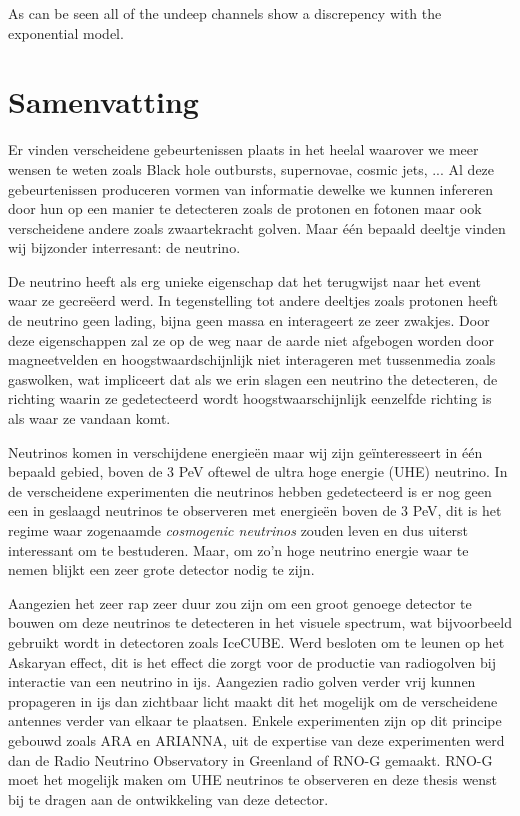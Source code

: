 \documentclass[11pt,a4paper,faculty=we,language=en,doctype=report]{cls/ugent-doc}
\begin{document}
As can be seen all of the undeep channels show a discrepency with
the exponential model. 

\newpage
\chapter*{Samenvatting}
Er vinden verscheidene gebeurtenissen plaats in het heelal waarover we
meer wensen te weten zoals Black hole outbursts, supernovae, cosmic jets, ...
Al deze gebeurtenissen produceren vormen van informatie dewelke we kunnen
infereren door hun op een manier te detecteren zoals de protonen en fotonen
maar ook verscheidene andere zoals zwaartekracht golven.
Maar één bepaald deeltje vinden wij bijzonder interresant: de neutrino.

De neutrino heeft als erg unieke eigenschap dat het terugwijst naar het event
waar ze gecreëerd werd. In tegenstelling tot andere deeltjes zoals protonen
heeft de neutrino geen lading, bijna geen massa en interageert ze zeer zwakjes.
Door deze eigenschappen zal ze op de weg naar de aarde niet afgebogen worden 
door magneetvelden en hoogstwaardschijnlijk niet interageren met tussenmedia zoals
gaswolken, wat impliceert dat als we erin slagen een neutrino the detecteren, de 
richting waarin ze gedetecteerd wordt hoogstwaarschijnlijk eenzelfde richting is als
waar ze vandaan komt.

Neutrinos komen in verschijdene energieën maar wij zijn geïnteresseert in één bepaald gebied,
boven de 3 PeV oftewel de ultra hoge energie (UHE) neutrino. In de verscheidene experimenten die 
neutrinos hebben gedetecteerd is er nog geen een in geslaagd neutrinos te observeren met 
energieën boven de 3 PeV, dit is het regime waar zogenaamde \textit{cosmogenic neutrinos} zouden
leven en dus uiterst interessant om te bestuderen. Maar, om zo'n hoge neutrino energie waar te nemen
blijkt een zeer grote detector nodig te zijn.

Aangezien het zeer rap zeer duur zou zijn om een groot genoege detector te bouwen om deze neutrinos 
te detecteren in het visuele spectrum, wat bijvoorbeeld gebruikt wordt in detectoren zoals IceCUBE.
Werd besloten om te leunen op het Askaryan effect, dit is het effect die zorgt voor de productie
van radiogolven bij interactie van een neutrino in ijs. Aangezien radio golven verder vrij kunnen
propageren in ijs dan zichtbaar licht maakt dit het mogelijk om de verscheidene antennes verder
van elkaar te plaatsen. Enkele experimenten zijn op dit principe gebouwd zoals ARA en ARIANNA,
uit de expertise van deze experimenten werd dan de Radio Neutrino Observatory in Greenland of RNO-G gemaakt.
RNO-G moet het mogelijk maken om UHE neutrinos te observeren en deze thesis wenst bij te dragen aan de ontwikkeling
van deze detector.
\end{document}
